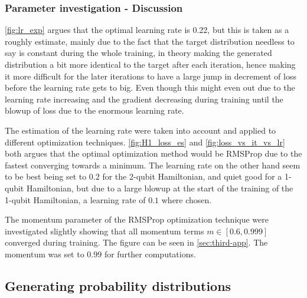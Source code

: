 \documentclass[../main.tex]{subfiles}
\begin{document}

\FloatBarrier
\subsubsection{Parameter investigation - Discussion}
\autoref{fig:lr_exp} argues that the optimal learning rate is 0.22, but this is taken as a roughly estimate, mainly due to the fact that the target distribution needless to say is constant during the whole training, in theory making the generated distribution a bit more identical to the target after each iteration, hence making it more difficult for the later iterations to have a large jump in decrement of loss before the learning rate gets to big. Even though this might even out due to the learning rate increasing and the gradient decreasing during training until the blowup of loss due to the enormous learning rate.

The estimation of the learning rate were taken into account and applied to different optimization techniques. \autoref{fig:H1_loss_es} and \autoref{fig:loss_vs_it_vs_lr} both argues that the optimal optimization method would be RMSProp due to the fastest converging towards a minimum. The learning rate on the other hand seem to be best being set to $0.2$ for the 2-qubit Hamiltonian, and quiet good for a 1-qubit Hamiltonian, but due to a large blowup at the start of the training of the 1-qubit Hamiltonian, a learning rate of $0.1$ where chosen.

The momentum parameter of the RMSProp optimization technique were investigated slightly showing that all momentum terms $m \in [0.6, 0.999]$ converged during training. The figure can be seen in \autoref{sec:third-app}. The momentum was set to $0.99$ for further computations. 

\FloatBarrier
\subsection{Generating probability distributions}
\end{document}

